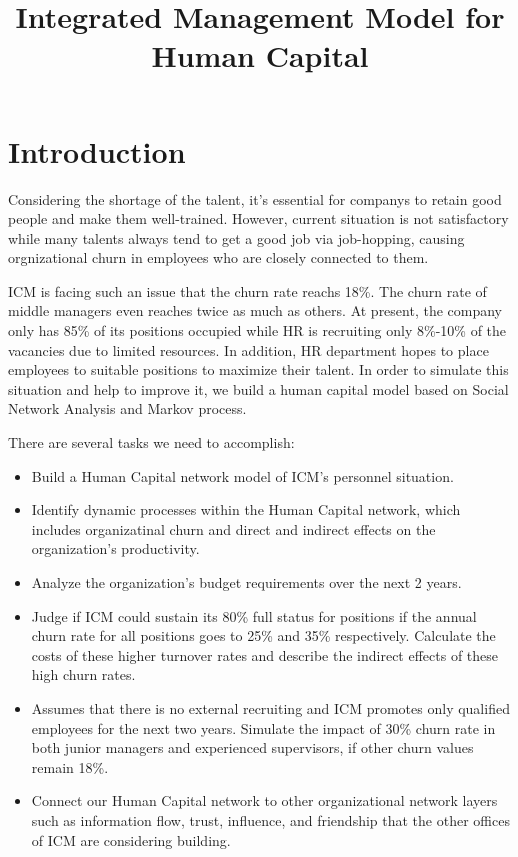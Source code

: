 \documentclass[12pt,a4paper,titlepage]{article}
\begin{document}
\title{Integrated Management Model for Human Capital}
\date{}
\maketitle

\tableofcontents

\newpage

\section{Introduction}
\label{sec:introduction}

Considering the shortage of the talent, it's essential for companys to
retain good people and make them well-trained. However, current
situation is not satisfactory while many talents always tend to get a
good job via job-hopping, causing orgnizational churn in employees who
are closely connected to them.

ICM is facing such an issue that the churn rate reachs 18\%. The churn rate of middle managers even reaches twice as much as others. At present, the company only has 85\% of its positions occupied while HR is recruiting only 8\%-10\% of the vacancies due to limited resources. In addition, HR department hopes to place employees to suitable positions to maximize their talent. In order to simulate this situation and help to improve it, we build a human capital model based on Social Network
Analysis and Markov process.

There are several tasks we need to accomplish:

\begin{itemize}
\item Build a Human Capital network model of ICM's personnel situation.

\item Identify dynamic processes within the Human Capital network,
  which includes organizatinal churn and direct and indirect effects on
  the organization's productivity.

\item Analyze the organization's budget requirements over the next 2
  years.

\item Judge if ICM could sustain its 80\% full status for positions if
  the annual churn rate for all positions goes to 25\% and 35\%
  respectively. Calculate the costs of these higher turnover rates and
  describe the indirect effects of these high churn rates.

\item Assumes that there is no external recruiting and ICM promotes
  only qualified employees for the next two years. Simulate the impact
  of 30\% churn rate in both junior managers and experienced
  supervisors, if other churn values remain 18\%.

\item Connect our Human Capital network to other organizational
  network layers such as information flow, trust, influence, and
  friendship that the other offices of ICM are considering building.
\end{itemize}
\end{document}

